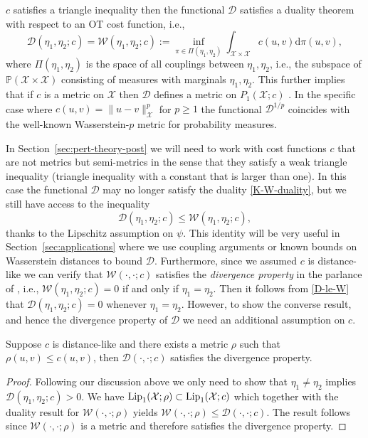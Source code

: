 \documentclass[final]{siamart171218}
\newcommand{\fh}[1]{{\color{blue} #1}}
\newcommand{\mcl}{\mathcal}
\newcommand{\mbb}{\mathbb}
\newcommand{\dd}{\text{d}}
\newcommand{\Lip}{{\rm Lip}_1}
\newcommand{\mX}{\mcl{X}}
\newcommand{\PP}{\mbb{P}}
\newcommand{\cc}{c}
\newcommand{\K}{\mathcal{D}}
\newcommand{\D}{\mathcal{D}}
\newcommand{\W}{\mathcal{W}}
\begin{document}
$c$ satisfies a triangle inequality then 
the functional $\D$ satisfies a
duality theorem with respect to an OT cost function, i.e.,
\begin{equation}\label{K-W-duality}
  \D(\eta_1, \eta_2; \cc) = \W( \eta_1, \eta_2; \cc) := \inf_{\pi \in \Pi( \eta_1, \eta_2)}
  \int_{\mX \times \mX} c(u,v) \dd \pi(u, v),
\end{equation}
where $\Pi(\eta_1, \eta_2)$ is the space of all couplings between $\eta_1, \eta_2$, i.e., the
subspace of $\PP(\mX \times \mX)$ consisting of measures with marginals $\eta_1, \eta_2$. 
This further implies that if $\cc$ is a metric on $\mX$ then $\D$ defines a metric
on $P_1(\mX; \cc)$ \cite{bogachev2012monge,villani-OT}.
In the specific case where
$\cc(u,v) = \| u -v \|_\mX^p$  for $p \ge 1$ the functional $\K^{1/p}$ coincides with the well-known Wasserstein-$p$ metric for probability measures. 


In Section~\ref{sec:pert-theory-post} we will 
need to work with cost functions $c$ that are not metrics but semi-metrics in the sense that 
they satisfy a weak triangle inequality (triangle inequality with a constant that is larger than one). 
In this case the functional $\D$ may no longer satisfy the duality \eqref{K-W-duality}, but 
 we still have access to the inequality 
\begin{equation}\label{D-le-W}
  \D(\eta_1, \eta_2; c) \le \W(\eta_1, \eta_2; c),
\end{equation}
thanks to the Lipschitz assumption on $\psi$. This identity will be very useful in 
Section~\ref{sec:applications}
where we use coupling arguments or known bounds on Wasserstein distances to bound $\D$. 
Furthermore, since we assumed $c$ is distance-like 
we can verify that $\W(\cdot, \cdot; c)$ satisfies 
the {\it divergence property} in the parlance of \cite{birrell2022f}, i.e., 
$\W(\eta_1, \eta_2; c) = 0$ if and only if $\eta_1 = \eta_2$. 
Then it follows from \eqref{D-le-W} that $\D(\eta_1, \eta_2; c) =0$ 
whenever $\eta_1 = \eta_2$. However, to show the converse result, and 
hence the divergence property of $\D$ we need an additional assumption on 
$\cc$. 

\begin{proposition}
  Suppose $c$ is distance-like and there exists a metric $\rho$  such that  $\rho(u, v) \le c(u,v)$, then $\D(\cdot, \cdot;c)$ 
  satisfies the divergence property.
\end{proposition}

\begin{proof}
Following our discussion above we only need to show that $\eta_1 \neq \eta_2$
implies $\D(\eta_1, \eta_2; c) >0$. We have
$\Lip(\mX; \rho) \subset \Lip(\mX; c)$ which together with the 
duality result for $\W(\cdot, \cdot; \rho)$ yields 
$\W(\cdot, \cdot; \rho) \le \D(\cdot, \cdot; c)$. The result follows 
since $\W(\cdot, \cdot; \rho)$ is a metric and therefore satisfies the divergence property.
\end{proof}
\end{document}
